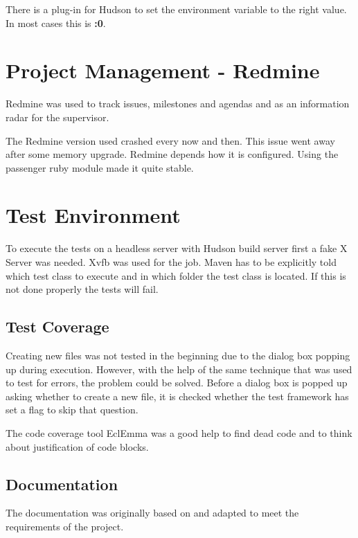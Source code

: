 There is a plug-in for Hudson\cite{hudson} to set the environment variable to
the right value. In most cases this is \textbf{:0}.

\section{Project Management - Redmine}

Redmine\cite{redmine} was used to track issues, milestones and agendas and as an information 
radar for the supervisor.

The Redmine version used crashed every now and then. This issue went away after
some memory upgrade. Redmine depends how it is configured. Using the passenger
ruby module made it quite stable. 

\section{Test Environment}

To execute the tests on a headless server with Hudson build server first a fake
X Server was needed. Xvfb\cite{xvfb} was used for the job. Maven has to be
explicitly told which test class to execute and in which folder the test class
is located. If this is not done properly the tests will fail.

\subsection{Test Coverage}

Creating new files was not tested in the beginning due to the dialog box popping 
up during execution. However, with the help of the same technique that was used 
to test for errors, the problem could be solved. Before a dialog box is popped 
up asking whether to create a new file, it is checked whether the test framework 
has set a flag to skip that question.

The code coverage tool EclEmma\cite{eclEmma} was a good help 
to find dead code and to think about justification of code blocks. 

\subsection{Documentation}

The documentation was originally based on \cite{AV08} and adapted to meet the 
requirements of the project.

